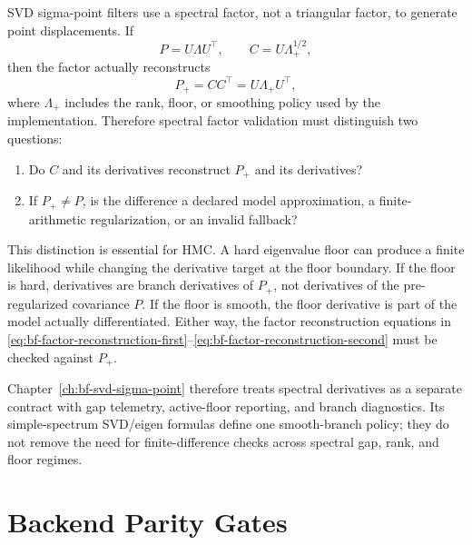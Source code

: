 SVD sigma-point filters use a spectral factor, not a triangular factor, to
generate point displacements.  If
\[
  P=U\Lambda U^\top,\qquad C=U\Lambda_+^{1/2},
\]
then the factor actually reconstructs
\[
  P_+ = CC^\top = U\Lambda_+U^\top,
\]
where $\Lambda_+$ includes the rank, floor, or smoothing policy used by the
implementation.  Therefore spectral factor validation must distinguish two
questions:
\begin{enumerate}[label=(\roman*)]
  \item Do $C$ and its derivatives reconstruct $P_+$ and its derivatives?
  \item If $P_+\ne P$, is the difference a declared model approximation, a
    finite-arithmetic regularization, or an invalid fallback?
\end{enumerate}
This distinction is essential for HMC.  A hard eigenvalue floor can produce a
finite likelihood while changing the derivative target at the floor boundary.
If the floor is hard, derivatives are branch derivatives of $P_+$, not
derivatives of the pre-regularized covariance $P$.  If the floor is smooth, the
floor derivative is part of the model actually differentiated.  Either way, the
factor reconstruction equations in
\eqref{eq:bf-factor-reconstruction-first}--\eqref{eq:bf-factor-reconstruction-second}
must be checked against $P_+$.

Chapter~\ref{ch:bf-svd-sigma-point} therefore treats spectral derivatives as a
separate contract with gap telemetry, active-floor reporting, and branch
diagnostics.  Its simple-spectrum SVD/eigen formulas define one smooth-branch
policy; they do not remove the need for finite-difference checks across spectral
gap, rank, and floor regimes.

\section{Backend Parity Gates}
\label{sec:bf-factor-backend-parity}

